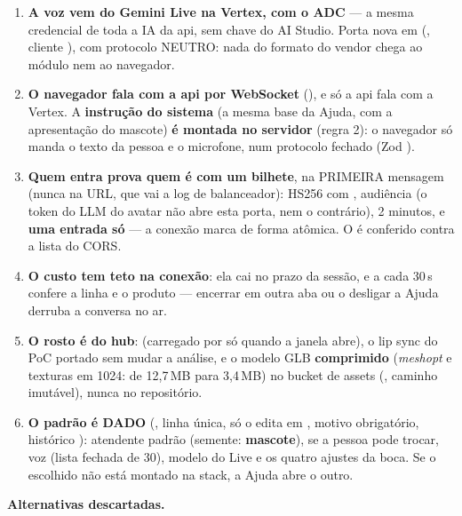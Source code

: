 \begin{enumerate}
  \item \textbf{A voz vem do Gemini Live na Vertex, com o ADC} --- a mesma
    credencial de toda a IA da api, sem chave do AI Studio. Porta nova em
     (, cliente ), com
    protocolo NEUTRO: nada do formato do vendor chega ao módulo  nem
    ao navegador.
  \item \textbf{O navegador fala com a api por WebSocket}
    (), e só a api fala com a Vertex. A
    \textbf{instrução do sistema} (a mesma base da Ajuda, com a apresentação do
    mascote) \textbf{é montada no servidor} (regra 2): o navegador só manda o
    texto da pessoa e o microfone, num protocolo fechado (Zod
    ).
  \item \textbf{Quem entra prova quem é com um bilhete}, na PRIMEIRA mensagem
    (nunca na URL, que vai a log de balanceador): HS256 com
    , audiência  (o token do LLM do
    avatar não abre esta porta, nem o contrário), 2 minutos, e \textbf{uma
    entrada só} --- a conexão marca  de
    forma atômica. O  é conferido contra a lista do CORS.
  \item \textbf{O custo tem teto na conexão}: ela cai no prazo da sessão, e a
    cada 30\,s confere a linha e o produto --- encerrar em outra aba ou o
     desligar a Ajuda derruba a conversa no ar.
  \item \textbf{O rosto é do hub}:  (carregado por 
    só quando a janela abre), o lip sync do PoC portado sem mudar a análise, e o
    modelo GLB \textbf{comprimido} (\emph{meshopt} e texturas em 1024: de
    12,7\,MB para 3,4\,MB) no bucket de assets (,
    caminho imutável), nunca no repositório.
  \item \textbf{O padrão é DADO} (, linha única, só o
     edita em , motivo obrigatório,
    histórico ): atendente padrão (semente:
    \textbf{mascote}), se a pessoa pode trocar, voz (lista fechada de 30),
    modelo do Live e os quatro ajustes da boca. Se o escolhido não está montado
    na stack, a Ajuda abre o outro.
\end{enumerate}

\textbf{Alternativas descartadas.}

